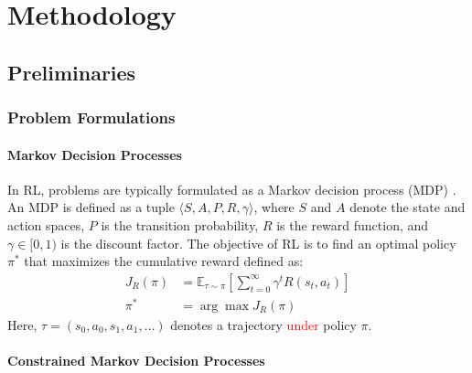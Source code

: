 \section{Methodology}


\subsection{Preliminaries}

\subsubsection{Problem Formulations}

\paragraph{\textbf{Markov Decision Processes}}

In RL, problems are typically formulated as a Markov decision process (MDP) \cite{sutton1998reinforcement}.
An MDP is defined as a tuple $\langle S, A, P, R, \gamma \rangle$, where $S$ and $A$ denote the state and action spaces, $P$ is the transition probability, $R$ is the reward function, and $\gamma \in [0, 1)$ is the discount factor.
The objective of RL is to find an optimal policy $\pi^*$ that maximizes the cumulative reward defined as:
\begin{equation} \label{eq:mdp_optimization_problem}
    \begin{aligned}
        J_R(\pi) &= \mathbb{E}_{\tau \sim \pi}\!\left[\sum^\infty_{t = 0} \gamma^t R(s_t, a_t)\right] \\
        \pi^* &= \arg \max J_R(\pi)
    \end{aligned}
\end{equation}
Here, $\tau = (s_0, a_0, s_1, a_1, \ldots)$ denotes a trajectory \textcolor{red}{under} policy $\pi$.

\paragraph{\textbf{Constrained Markov Decision Processes}}

